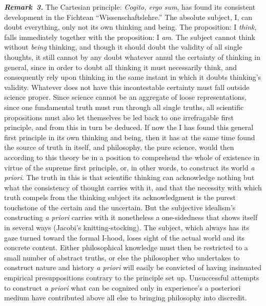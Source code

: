 \documentclass[12pt]{book}
\newcommand{\anm}[1]{\emph{\textbf{Remark~#1.}}}
\begin{document}
\anm{3} The Cartesian principle: \textit{Cogito, ergo sum}, has found its
consistent development in the Fichtean ``Wissenschaftslehre.'' The absolute
subject, I, can doubt everything, only not its own thinking and being. The
proposition: I \emph{think}, falls immediately together with the
proposition: I \emph{am}. The subject cannot think without \emph{being}
thinking, and though it should doubt the validity of all single thoughts, it
still cannot by any doubt whatever annul the certainty of thinking in
general, since in order to doubt all thinking it must necessarily think, and
consequently rely upon thinking in the same instant in which it doubts
thinking's validity. Whatever does not have this incontestable certainty
must fall outside science proper. Since science cannot be an aggregate of
loose representations, since one fundamental truth must run through all
single truths, all scientific propositions must also let themselves be led
back to one irrefragable first principle, and from this in turn be deduced.
If now the I has found this general first principle in its own thinking and
being, then it has at the same time found the source of truth in itself, and
philosophy, the pure science, would then according to this theory be in a
position to comprehend the whole of existence in virtue of the supreme first
principle, or, in other words, to construct its world \textit{a priori}. The
truth in this is that scientific thinking can acknowledge nothing but what
the consistency of thought carries with it, and that the necessity with
which truth compels from the thinking subject its acknowledgment is the
purest touchstone of the certain and the uncertain. But the subjective
idealism's constructing \textit{a priori} carries with it nonetheless a
one-sidedness that shows itself in several ways (Jacobi's
knitting-stocking). The subject, which always has its gaze turned toward the
formal I-hood, loses sight of the actual world and its concrete content.
Either philosophical knowledge must then be restricted to a small number of
abstract truths, or else the philosopher who undertakes to construct nature
and history \textit{a priori} will easily be convicted of having
insinuated empirical presuppositions contrary to the principle set up.
Unsuccessful attempts to construct \textit{a priori} what can be cognized
only in experience's a posteriori medium have contributed above all else to
bringing philosophy into discredit.
\end{document}
